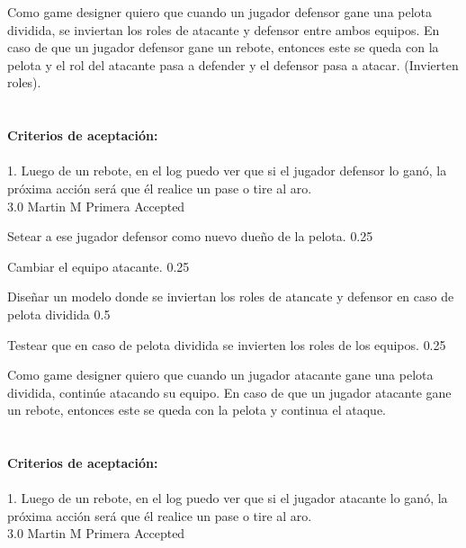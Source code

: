 	{Como game designer quiero que cuando un jugador defensor gane una pelota dividida, se inviertan los roles de atacante y defensor entre ambos equipos.} %
	{En caso de que un jugador defensor gane un rebote, entonces este se queda con la pelota y el rol del atacante pasa a defender y el defensor pasa a atacar. (Invierten roles). \\
  \\
  \\
\textbf{Criterios de aceptación:}\\
  \\
1. Luego de un rebote, en el log puedo ver que si el jugador defensor lo ganó, la próxima acción será que él realice un pase o tire al aro. \\
} %
	{} %
	{3.0} %
	{Martin M} %
	{Primera} %
	{Accepted} %

		{Setear a ese jugador defensor como nuevo dueño de la pelota.} %
		{} %
		{0.25} %
		{} %
		{} %
		{} %

		{Cambiar el equipo atacante.} %
		{} %
		{0.25} %
		{} %
		{} %
		{} %

		{Diseñar un modelo donde se inviertan los roles de atancate y defensor en caso de pelota dividida} %
		{} %
		{0.5} %
		{} %
		{} %
		{} %

		{Testear que en caso de pelota dividida se invierten los roles de los equipos.} %
		{} %
		{0.25} %
		{} %
		{} %
		{} %
\vspace{20pt}


	{Como game designer quiero que cuando un jugador atacante gane una pelota dividida, contin\'ue atacando su equipo.} %
	{ En caso de que un jugador atacante gane un rebote, entonces este se queda con la pelota y continua el ataque. \\
  \\
  \\
\textbf{Criterios de aceptación:}\\
  \\
1. Luego de un rebote, en el log puedo ver que si el jugador atacante lo ganó, la próxima acción será que él realice un pase o tire al aro. \\
} %
	{} %
	{3.0} %
	{Martin M} %
	{Primera} %
	{Accepted} %

